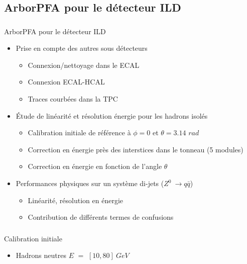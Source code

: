 \documentclass[8pt]{beamer}
\begin{document}
  \subsection{ArborPFA pour le détecteur ILD}

  \begin{frame}
  \frametitle{\secname}
  \framesubtitle{\subsecname}
    \begin{block}{ArborPFA pour le détecteur ILD}
      \begin{itemize}
        \item Prise en compte des autres sous détecteurs
        \begin{itemize}
          \item Connexion/nettoyage dans le ECAL
          \item Connexion ECAL-HCAL
          \item Traces courbées dans la TPC
        \end{itemize}
        \item Étude de linéarité et résolution énergie pour les hadrons isolés
        \begin{itemize}
          \item Calibration initiale de référence à $\phi=0$ et $\theta=3.14$ $rad$
          \item Correction en énergie près des interstices dans le tonneau (5 modules)
          \item Correction en énergie en fonction de l'angle $\theta$
        \end{itemize}
        \item Performances physiques sur un système di-jets ($Z^0~\rightarrow q\bar{q}$)
        \begin{itemize}
          \item Linéarité, résolution en énergie
          \item Contribution de différents termes de confusions
        \end{itemize}
      \end{itemize}
    \end{block}
  \end{frame}

  \begin{frame}
  \frametitle{\secname}
  \framesubtitle{\subsecname}
    \begin{block}{Calibration initiale}
      \begin{itemize}
        \item Hadrons neutres $E$ $=$ $[10, 80]~GeV$
      \end{itemize}
    \end{block}
  \end{frame}
\end{document}
